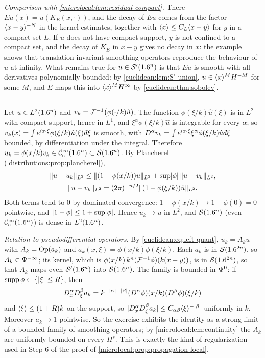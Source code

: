 \emph{Comparison with \cref{microlocal:lem:residual-compact}.} There $Eu(x)=u(K_E(x,\cdot))$, and
the decay of $Eu$ comes from the factor $\langle x-y\rangle^{-N}$ in the kernel estimates, together with
$\langle x\rangle\le C_L\langle x-y\rangle$ for $y$ in a compact set $L$. If $u$ does not have compact support, $y$
is not confined to a compact set, and the decay of $K_E$ in $x-y$ gives no decay in $x$: the
example shows that translation-invariant smoothing operators reproduce the behaviour of $u$
at infinity. What remains true for $u\in\mathcal{S}'(1.6^n)$ is that $Eu$ is smooth with all
derivatives polynomially bounded: by \cref{euclidean:lem:S'-union}, $u\in\langle x\rangle^MH^{-M}$ for some
$M$, and $E$ maps this into $\langle x\rangle^MH^\infty$ by \cref{euclidean:thm:sobolev}.

\subsection*{}
Let $u\in L^2(1.6^n)$ and $v_k=\mathcal{F}^{-1}\bigl(\phi(\cdot/k)\hat u\bigr)$. The function
$\phi(\xi/k)\hat u(\xi)$ is in $L^2$ with compact support, hence in $L^1$, and
$\xi^\alpha\phi(\xi/k)\hat u$ is integrable for every $\alpha$; so
$v_k(x)=\int e^{ix\cdot\xi}\phi(\xi/k)\hat u(\xi)\,\dbar\xi$ is smooth, with
$D^\alpha v_k=\int e^{ix\cdot\xi}\xi^\alpha\phi(\xi/k)\hat u\,\dbar\xi$ bounded, by differentiation
under the integral. Therefore $u_k=\phi(x/k)v_k\in\mathcal{C}^\infty_{\mathrm{c}}(1.6^n)\subset\mathcal{S}(1.6^n)$. By Plancherel
(\cref{distributions:prop:plancherel}),
\begin{gather*}
  \lVert u-u_k\rVert_{L^2}\le\lVert (1-\phi(x/k))u\rVert_{L^2}+\sup\lvert \phi\rvert\,\lVert u-v_k\rVert_{L^2},\\
  \lVert u-v_k\rVert_{L^2}=(2\pi)^{-n/2}\lVert (1-\phi(\xi/k))\hat u\rVert_{L^2}.
\end{gather*}
Both terms tend to $0$ by dominated convergence: $1-\phi(x/k)\to1-\phi(0)=0$ pointwise, and
$\lvert 1-\phi\rvert\le1+\sup\lvert \phi\rvert$. Hence $u_k\to u$ in $L^2$, and $\mathcal{S}(1.6^n)$ (even $\mathcal{C}^\infty_{\mathrm{c}}(1.6^n)$) is
dense in $L^2(1.6^n)$.

\emph{Relation to pseudodifferential operators.} By \eqref{euclidean:eq:left-quant},
$u_k=A_ku$ with $A_k=\operatorname{Op}(a_k)$ and $a_k(x,\xi)=\phi(x/k)\phi(\xi/k)$. Each $a_k$ is in
$\mathcal{S}(1.6^{2n})$, so $A_k\in\Psi^{-\infty}$; its kernel, which is
$\phi(x/k)\,k^n(\mathcal{F}^{-1}\phi)(k(x-y))$, is in $\mathcal{S}(1.6^{2n})$, so that $A_k$ maps even $\mathcal{S}'(1.6^n)$
into $\mathcal{S}(1.6^n)$. The family is bounded in $\Psi^{0}$: if $\operatorname{supp}\phi\subset\{\lvert \xi\rvert\le R\}$, then
\begin{equation*}
  D^\alpha_xD^\beta_\xi a_k=k^{-\lvert \alpha\rvert-\lvert \beta\rvert}(D^\alpha\phi)(x/k)(D^\beta\phi)(\xi/k)
\end{equation*}
and
$\langle \xi\rangle\le(1+R)k$ on the support, so $\lvert D^\alpha_xD^\beta_\xi a_k\rvert\le C_{\alpha\beta}\langle \xi\rangle^{-\lvert \beta\rvert}$
uniformly in $k$. Moreover $a_k\to1$ pointwise. So the exercise exhibits the identity as a strong
limit of a bounded family of smoothing operators; by \cref{microlocal:lem:continuity} the $A_k$
are uniformly bounded on every $H^s$. This is exactly the kind of regularization used in Step
6 of the proof of \cref{microlocal:prop:propagation-local}.

